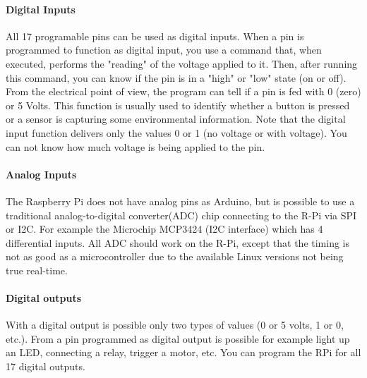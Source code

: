 \documentclass{acm_proc_article-sp}
\begin{document}
\paragraph{Digital Inputs}
All 17 programable pins can be used as digital inputs. When a pin is programmed to function as digital input, you use a command that, when executed, performs the "reading" of the voltage applied to it. Then, after running this command, you can know if the pin is in a "high" or "low" state (on or off).
\newline
\newline
From the electrical point of view, the program can tell if a pin is fed with 0 (zero) or 5 Volts. This function is usually used to identify whether a button is pressed or a sensor is capturing some environmental information. Note that the digital input function delivers only the values 0 or 1 (no voltage or with voltage). You can not know how much voltage is being applied to the pin.

\paragraph{Analog Inputs}
The Raspberry Pi does not have analog pins as Arduino, but is possible to use a traditional analog-to-digital converter(ADC) chip connecting to the R-Pi via SPI or I2C. For example the Microchip MCP3424 (I2C interface) which has 4 differential inputs. All ADC should work on the R-Pi, except that the timing is not as good as a microcontroller due to the available Linux versions not being true real-time. 

\paragraph{Digital outputs}
With a digital output is possible only two types of values (0 or 5 volts, 1 or 0, etc.). From a pin programmed as digital output is possible for example light up an LED, connecting a relay, trigger a motor, etc. You can program the RPi for all 17 digital outputs.
\end{document}
